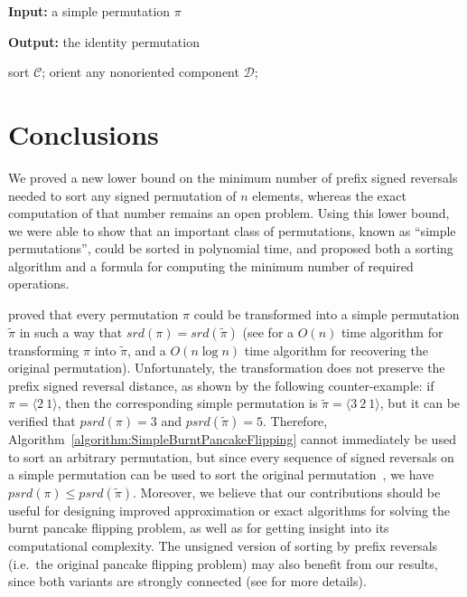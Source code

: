 \documentclass[review]{elsarticle}
\newcommand{\algorithmicinputdata}{\textbf{Input: }}
\newcommand{\algorithmicresult}{\textbf{Output: }}
\newcommand{\ie}{i.e.\ }
\begin{document}
\begin{algorithm}
\caption{{\sc SimpleBurntPancakeFlipping($\pi$)}}
\label{algorithm:SimpleBurntPancakeFlipping}
\algorithmicinputdata a simple permutation $\pi$

\algorithmicresult the identity permutation
\begin{algorithmic}[1]
\WHILE {$\pi\neq\iota$}
        \STATE sort $\mathcal C$;
    \ELSE
        \STATE orient any nonoriented component $\mathcal D$;
    \ENDIF
\ENDWHILE
\end{algorithmic}
\end{algorithm}

\section{Conclusions}

We proved a new lower bound on the minimum number of prefix signed reversals needed to sort any signed permutation of $n$ elements, whereas the exact computation of that number remains an open problem. Using this lower bound, we were able to show that an important class of permutations, known as ``simple permutations'', could be sorted in polynomial time, and proposed both a sorting algorithm and a formula for computing the minimum number of required operations.

\citet{hannenhalli-transforming} proved that every permutation $\pi$ could be transformed into a simple permutation $\tilde{\pi}$ in such a way that $srd(\pi)=srd(\tilde{\pi})$ (see \citet{gog-fast} for a $O(n)$ time algorithm for transforming $\pi$ into $\tilde{\pi}$, and a $O(n\log n)$ time algorithm for recovering the original permutation). Unfortunately, the transformation does not preserve the prefix signed reversal distance, as shown by the following counter-example: if $\pi=\langle 2\ 1\rangle$, then the corresponding simple permutation is $\tilde{\pi}=\langle 3\ 2\ 1\rangle$, but it can be verified that $psrd(\pi)=3$ and $psrd(\tilde{\pi})=5$. Therefore, Algorithm~\ref{algorithm:SimpleBurntPancakeFlipping} cannot immediately be used to sort an arbitrary permutation, but since every sequence of signed reversals on a simple permutation can be used to sort the original permutation~\cite{hannenhalli-transforming}, we have $psrd(\pi)\leq psrd(\tilde{\pi})$. 
Moreover, we believe that our contributions should be useful for designing improved approximation or exact algorithms for solving the burnt pancake flipping problem, as well as for getting insight into its computational complexity. The unsigned version of sorting by prefix reversals (\ie the original pancake flipping problem) may also benefit from our results, since both variants are strongly connected (see \citet{hannenhalli-tocut} for more details).



\end{document}

